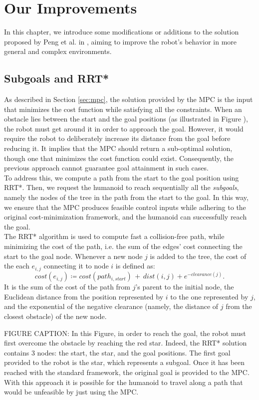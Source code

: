 \section{Our Improvements}\label{sec:improvements}

In this chapter, we introduce some modifications or additions to the solution proposed by Peng et al. in \cite{peng_main_paper}, aiming to improve the robot's behavior in more general and complex environments.

\subsection{Subgoals and RRT*}
As described in Section \ref{sec:mpc}, the solution provided by the MPC is the input that minimizes the cost function while satisfying all the constraints. When an obstacle lies between the start and the goal positions (as illustrated in Figure ), the robot must get around it in order to approach the goal. However, it would require the robot to deliberately increase its distance from the goal before reducing it. It implies that the MPC should return a sub-optimal solution, though one that minimizes the cost function could exist. Consequently, the previous approach cannot guarantee goal attainment in such cases.\\
To address this, we compute a path from the start to the goal position using RRT*. Then, we request the humanoid to reach sequentially all the \textit{subgoals}, namely the nodes of the tree in the path from the start to the goal. In this way, we ensure that the MPC produces feasible control inputs while adhering to the original cost-minimization framework, and the humanoid can successfully reach the goal.\\
The RRT* algorithm is used to compute fast a collision-free path, while minimizing the cost of the path, i.e. the sum of the edges' cost connecting the start to the goal node. Whenever a new node $j$ is added to the tree, the cost of the each $e_{i,j}$ connecting it to node $i$ is defined as:
$$ cost(e_{i, j}) \coloneqq  cost(path_{i,start})\, +\,dist(i, j) + e^{-clearance(j)}. $$
It is the sum of the cost of the path from $j$'s parent to the initial node, the Euclidean distance from the position represented by $i$ to the one represented by $j$, and the exponential of the negative clearance (namely, the distance of $j$ from the closest obstacle) of the new node.

FIGURE CAPTION:
In this Figure, in order to reach the goal, the robot must first overcome the obstacle by reaching the red star. Indeed, the RRT* solution contains 3 nodes: the start, the star, and the goal positions. The first goal provided to the robot is the star, which represents a subgoal. Once it has been reached with the standard framework, the original goal is provided to the MPC. With this approach it is possible for the humanoid to travel along a path that would be unfeasible by just using the MPC.